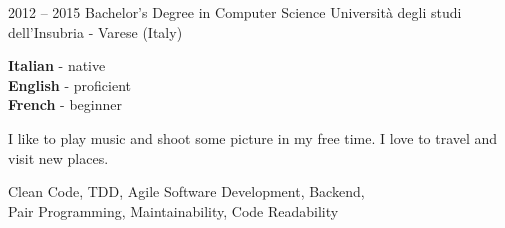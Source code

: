 \documentclass[9pt]{developercv} %
\begin{document}


\begin{entrylist}
	\entry
		{2012 -- 2015}
		{Bachelor's Degree in Computer Science}
		{Università degli studi dell'Insubria - Varese (Italy)}
		{}
\end{entrylist}


\begin{minipage}[t]{0.3\textwidth}
	\vspace{-\baselineskip} %

	
	\textbf{Italian} - native\\
	\textbf{English} - proficient\\
	\textbf{French} - beginner
\end{minipage}
\hfill
\begin{minipage}[t]{0.3\textwidth}
	\vspace{-\baselineskip} %
	
	
	I like to play music and shoot some picture in my free time. I love to travel and visit new places.
\end{minipage}
\hfill
\begin{minipage}[t]{0.3\textwidth}
	\vspace{-\baselineskip} %
	
	
	Clean Code, TDD, Agile Software Development, Backend,\\
	Pair Programming, Maintainability, Code Readability
\end{minipage}

\end{document}
